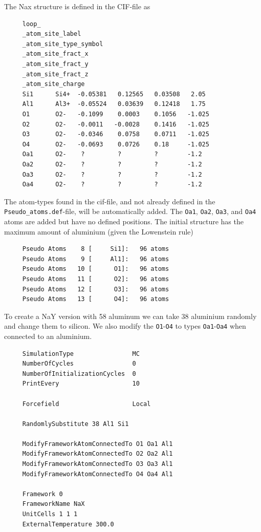 The Nax structure is defined in the CIF-file as
\begin{tiny}
\begin{verbatim}
     loop_
     _atom_site_label
     _atom_site_type_symbol
     _atom_site_fract_x
     _atom_site_fract_y
     _atom_site_fract_z
     _atom_site_charge
     Si1      Si4+  -0.05381   0.12565   0.03508   2.05
     Al1      Al3+  -0.05524   0.03639   0.12418   1.75
     O1       O2-   -0.1099    0.0003    0.1056   -1.025
     O2       O2-   -0.0011   -0.0028    0.1416   -1.025
     O3       O2-   -0.0346    0.0758    0.0711   -1.025
     O4       O2-   -0.0693    0.0726    0.18     -1.025
     Oa1      O2-    ?         ?         ?        -1.2
     Oa2      O2-    ?         ?         ?        -1.2
     Oa3      O2-    ?         ?         ?        -1.2
     Oa4      O2-    ?         ?         ?        -1.2
\end{verbatim}
\end{tiny}
The atom-types found in the cif-file, and not already defined in the \verb+Pseudo_atoms.def+-file, will be automatically added.
The \verb+Oa1+, \verb+Oa2+, \verb+Oa3+, and \verb+Oa4+ atoms are added but have no defined positions.
The initial structure has the maximum amount of aluminium (given the Lowenstein rule)
\begin{tiny}
\begin{verbatim}
     Pseudo Atoms    8 [     Si1]:   96 atoms
     Pseudo Atoms    9 [     Al1]:   96 atoms
     Pseudo Atoms   10 [      O1]:   96 atoms
     Pseudo Atoms   11 [      O2]:   96 atoms
     Pseudo Atoms   12 [      O3]:   96 atoms
     Pseudo Atoms   13 [      O4]:   96 atoms
\end{verbatim}
\end{tiny}
To create a NaY version with 58 aluminum we can take 38 aluminium randomly and change them to silicon.
We also modify the \verb+O1+-\verb+O4+ to types \verb+Oa1+-\verb+Oa4+ when connected to an aluminium.
\begin{tiny}
\begin{verbatim}
     SimulationType                MC
     NumberOfCycles                0
     NumberOfInitializationCycles  0
     PrintEvery                    10
     
     Forcefield                    Local
     
     RandomlySubstitute 38 Al1 Si1
     
     ModifyFrameworkAtomConnectedTo O1 Oa1 Al1
     ModifyFrameworkAtomConnectedTo O2 Oa2 Al1
     ModifyFrameworkAtomConnectedTo O3 Oa3 Al1
     ModifyFrameworkAtomConnectedTo O4 Oa4 Al1
     
     Framework 0
     FrameworkName NaX
     UnitCells 1 1 1
     ExternalTemperature 300.0
\end{verbatim}
\end{tiny}
